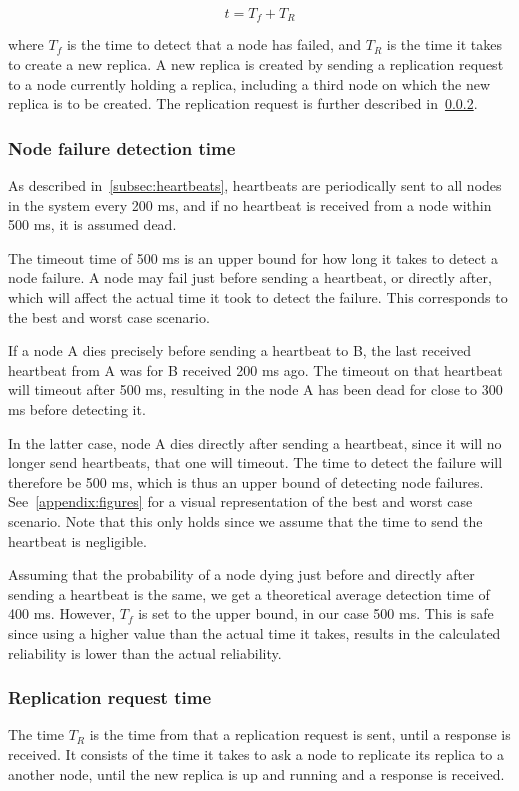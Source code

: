\documentclass{cslthse-msc}
\begin{document}
\begin{equation} \label{eq:rep_time}
	t = T_f + T_R
\end{equation}

where $T_f$ is the time to detect that a node has failed, and $T_R$ is the time it takes to create a new replica. A new replica is created by sending a replication request to a node currently holding a replica, including a third node on which the new replica is to be created. The replication request is further described in~\cref{sec:replication_time}.

\subsubsection{Node failure detection time} \label{sec:node_failure_detection_time}
As described in~\cref{subsec:heartbeats}, heartbeats are periodically sent to all nodes in the system every 200 ms, and if no heartbeat is received from a node within 500 ms, it is assumed dead.

The timeout time of 500 ms is an upper bound for how long it takes to detect a node failure. A node may fail just before sending a heartbeat, or directly after, which will affect the actual time it took to detect the failure. This corresponds to the best and worst case scenario. 

If a node A dies precisely before sending a heartbeat to B, the last received heartbeat from A was for B received 200 ms ago. The timeout on that heartbeat will timeout after 500 ms, resulting in the node A has been dead for close to 300 ms before detecting it.

In the latter case, node A dies directly after sending a heartbeat, since it will no longer send heartbeats, that one will timeout. The time to detect the failure will therefore be 500 ms, which is thus an upper bound of detecting node failures. See~\cref{appendix:figures} for a visual representation of the best and worst case scenario. Note that this only holds since we assume that the time to send the heartbeat is negligible.

Assuming that the probability of a node dying just before and directly after sending a heartbeat is the same, we get a theoretical average detection time of 400 ms. However, $T_f$ is set to the upper bound, in our case 500 ms. This is safe since using a higher value than the actual time it takes, results in the calculated reliability is lower than the actual reliability.


\subsubsection{Replication request time} \label{sec:replication_time}
The time $T_R$ is the time from that a replication request is sent, until a response is received. It consists of the time it takes to ask a node to replicate its replica to a another node, until the new replica is up and running and a response is received. 
\end{document}

